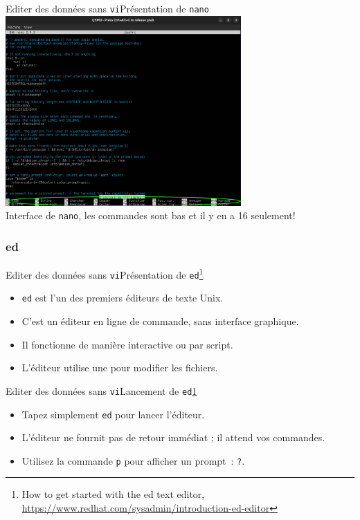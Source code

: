 \documentclass{beamer}
\begin{document}
    \begin{frame}{Editer des données sans \lstinline{vi}Présentation de \lstinline{nano}}
        \centering
        \includegraphics[width=9cm]{image/nano-screen.drawio} \\ Interface de \lstinline{nano}, les commandes sont bas et il y en a 16 seulement! \\
    \end{frame}

    \subsubsection{ed}\label{subsubsec:ed}
    \begin{frame}{Editer des données sans \lstinline{vi}}{Présentation de \lstinline{ed}\footnote{\label{redhated}How to get started with the ed text editor, \url{https://www.redhat.com/sysadmin/introduction-ed-editor}}}
        \begin{itemize}
            \item \lstinline{ed} est l'un des premiers éditeurs de texte Unix.
            \item C'est un éditeur en ligne de commande, sans interface graphique.
            \item Il fonctionne de manière interactive ou par script.
            \item L'éditeur utilise une  pour modifier les fichiers.
        \end{itemize}
    \end{frame}

    \begin{frame}{Editer des données sans \lstinline{vi}}{Lancement de \lstinline{ed}\cref{redhated}}
        \begin{itemize}
            \item Tapez simplement \lstinline{ed} pour lancer l'éditeur.
            \item L'éditeur ne fournit pas de retour immédiat ; il attend vos commandes.
            \item Utilisez la commande \lstinline{p} pour afficher un prompt~: \lstinline{?}.
        \end{itemize}
    \end{frame}
\end{document}
